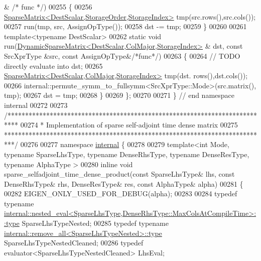 \begin{DoxyCode}
      & \textcolor{comment}{/* func */})
00255   \{
00256     \hyperlink{group___sparse_core___module_class_eigen_1_1_sparse_matrix}{SparseMatrix<DestScalar,StorageOrder,StorageIndex>} 
      tmp(src.rows(),src.cols());
00257     run(tmp, src, AssignOpType());
00258     dst -= tmp;
00259   \}
00260   
00261   \textcolor{keyword}{template}<\textcolor{keyword}{typename} DestScalar>
00262   \textcolor{keyword}{static} \textcolor{keywordtype}{void} run(\hyperlink{class_eigen_1_1_dynamic_sparse_matrix}{DynamicSparseMatrix<DestScalar,ColMajor,StorageIndex>}
      & dst, \textcolor{keyword}{const} SrcXprType &src, \textcolor{keyword}{const} AssignOpType&\textcolor{comment}{/*func*/})
00263   \{
00264     \textcolor{comment}{// TODO directly evaluate into dst;}
00265     \hyperlink{group___sparse_core___module_class_eigen_1_1_sparse_matrix}{SparseMatrix<DestScalar,ColMajor,StorageIndex>} tmp(dst.
      rows(),dst.cols());
00266     internal::permute\_symm\_to\_fullsymm<SrcXprType::Mode>(src.matrix(), tmp);
00267     dst = tmp;
00268   \}
00269 \};
00270 
00271 \} \textcolor{comment}{// end namespace internal}
00272 
00273 \textcolor{comment}{/***************************************************************************}
00274 \textcolor{comment}{* Implementation of sparse self-adjoint time dense matrix}
00275 \textcolor{comment}{***************************************************************************/}
00276 
00277 \textcolor{keyword}{namespace }\hyperlink{namespaceinternal}{internal} \{
00278 
00279 \textcolor{keyword}{template}<\textcolor{keywordtype}{int} Mode, \textcolor{keyword}{typename} SparseLhsType, \textcolor{keyword}{typename} DenseRhsType, \textcolor{keyword}{typename} DenseResType, \textcolor{keyword}{typename} AlphaType
      >
00280 \textcolor{keyword}{inline} \textcolor{keywordtype}{void} sparse\_selfadjoint\_time\_dense\_product(\textcolor{keyword}{const} SparseLhsType& lhs, \textcolor{keyword}{const} DenseRhsType& rhs, 
      DenseResType& res, \textcolor{keyword}{const} AlphaType& alpha)
00281 \{
00282   EIGEN\_ONLY\_USED\_FOR\_DEBUG(alpha);
00283   
00284   \textcolor{keyword}{typedef} \textcolor{keyword}{typename} 
      \hyperlink{class_eigen_1_1internal_1_1_tensor_lazy_evaluator_writable}{internal::nested\_eval<SparseLhsType,DenseRhsType::MaxColsAtCompileTime>::type}
       SparseLhsTypeNested;
00285   \textcolor{keyword}{typedef} \textcolor{keyword}{typename} \hyperlink{group___sparse_core___module}{internal::remove\_all<SparseLhsTypeNested>::type}
       SparseLhsTypeNestedCleaned;
00286   \textcolor{keyword}{typedef} evaluator<SparseLhsTypeNestedCleaned> LhsEval;

\end{DoxyCode}

